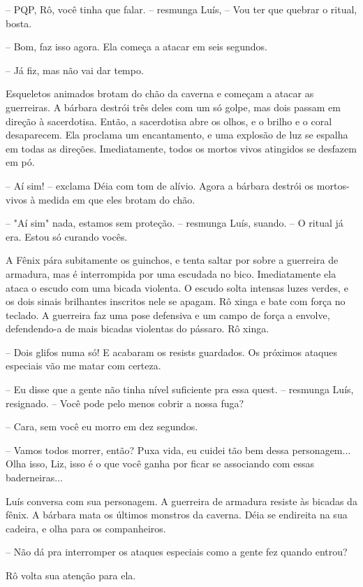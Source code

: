 -- PQP, Rô, você tinha que falar. -- resmunga Luís, -- Vou ter que quebrar o ritual, bosta.

-- Bom, faz isso agora. Ela começa a atacar em seis segundos.

-- Já fiz, mas não vai dar tempo.

Esqueletos animados brotam do chão da caverna e começam a atacar as guerreiras. A bárbara destrói três deles com um só golpe, mas dois passam em direção à sacerdotisa. Então, a sacerdotisa abre os olhos, e o brilho e o coral desaparecem. Ela proclama um encantamento, e uma explosão de luz se espalha em todas as direções. Imediatamente, todos os mortos vivos atingidos se desfazem em pó.

-- Aí sim! -- exclama Déia com tom de alívio. Agora a bárbara destrói os mortos-vivos à medida em que eles brotam do chão.

-- "Aí sim" nada, estamos sem proteção. -- resmunga Luís, suando. -- O ritual já era. Estou só curando vocês.

A Fênix pára subitamente os guinchos, e tenta saltar por sobre a guerreira de armadura, mas é interrompida por uma escudada no bico. Imediatamente ela ataca o escudo com uma bicada violenta. O escudo solta intensas luzes verdes, e os dois sinais brilhantes inscritos nele se apagam. Rô xinga e bate com força no teclado. A guerreira faz uma pose defensiva e um campo de força a envolve, defendendo-a de mais bicadas violentas do pássaro. Rô xinga.

-- Dois glifos numa só! E acabaram os resists guardados. Os próximos ataques especiais vão me matar com certeza.

-- Eu disse que a gente não tinha nível suficiente pra essa quest. -- resmunga Luís, resignado. -- Você pode pelo menos cobrir a nossa fuga?

-- Cara, sem você eu morro em dez segundos.

-- Vamos todos morrer, então? Puxa vida, eu cuidei tão bem dessa personagem... Olha isso, Liz, isso é o que você ganha por ficar se associando com essas baderneiras...

Luís conversa com sua personagem. A guerreira de armadura resiste às bicadas da fênix. A bárbara mata os últimos monstros da caverna. Déia se endireita na sua cadeira, e olha para os companheiros.

-- Não dá pra interromper os ataques especiais como a gente fez quando entrou?

Rô volta sua atenção para ela.

